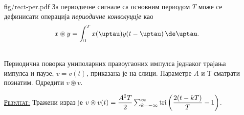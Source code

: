 \begin{slikaDesno}{fig/rect-per.pdf}
\PID За 
периодичне сигнале са основним 
периодом $T$ може се дефинисати 
операција \textit{периодичне
конволуције} као 
$$x \circledast y = \int_{0}^T 
x(\uptau) y(t-\uptau) \, \de \uptau.$$
\end{slikaDesno} \\
Периодична поворка 
униполарних
правоугаоних импулса једнаког трајања импулса и паузе,
$v = v(t)$, приказана је на слици. Параметре $A$ и $Т$ сматрати познатим.
Одредити $v \circledast v$.
\vspace*{2mm}

\textsc{\underline{Резултат:}}
Тражени израз је $v \circledast v (t) = 
\dfrac{A^2 T}{2}
\sum_{k = -\infty}^{\infty}  
{\rm tri}\left( 
\dfrac{2(t - kT)}{T} - 1
\right)
$.